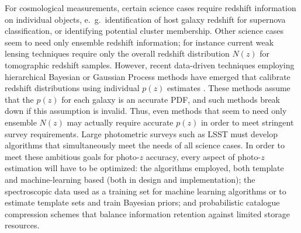 For cosmological measurements, certain science cases require redshift information on individual objects, e.~g.~identification of host galaxy redshift for supernova classification, or identifying potential cluster membership.
Other science cases seem to need only ensemble redshift information; for instance current weak lensing techniques require only the overall redshift distribution $N(z)$ for tomographic redshift samples.  However, recent data-driven techniques employing hierarchical Bayesian or Gaussian Process methods have emerged that calibrate redshift distributions using individual $p(z)$ estimates \citep[e.~g.~][]{Sanchez:2018}.  These methods assume that the $p(z)$ for each galaxy is an accurate PDF, and such methods break down if this assumption is invalid.  Thus, even methods that seem to need only ensemble $N(z)$ may actually require accurate $p(z)$ in order to meet stringent survey requirements.
Large photometric surveys such as LSST must develop algorithms that simultaneously meet the needs of all science cases.
In order to meet these ambitious goals for photo-$z$ accuracy, every aspect of photo-$z$ estimation will have to be optimized: the algorithms employed, both template and machine-learning based (both in design and implementation); the spectroscopic data used as a training set for machine learning algorithms or to estimate template sets and train Bayesian priors; and probabilistic catalogue compression schemes that balance information retention against limited storage resources.

